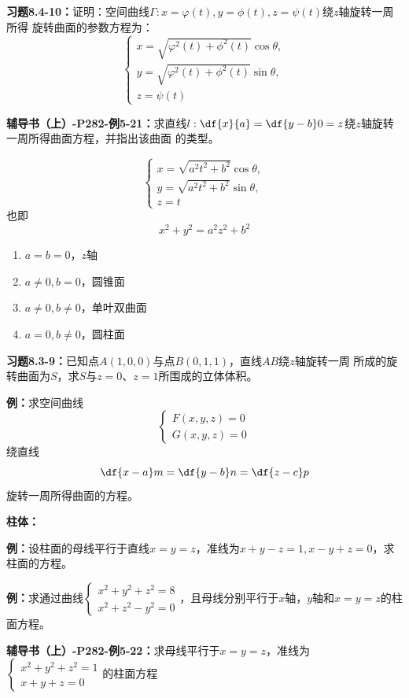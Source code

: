 {\bf 习题8.4-10：}证明：空间曲线$\Gamma:x=\varphi(t),y=\phi(t),z=\psi(t)$绕$z$轴旋转一周所得
旋转曲面的参数方程为：
$$\left\{\begin{array}{l}
	x=\sqrt{\varphi^2(t)+\phi^2(t)}\cos\theta,\\
	y=\sqrt{\varphi^2(t)+\phi^2(t)}\sin\theta,\\
	z=\psi(t)
\end{array}\right.$$

{\bf 辅导书（上）-P282-例5-21：}求直线$l:\df{x}{a}=\df{y-b}0=z$绕$z$轴旋转一周所得曲面方程，并指出该曲面
的类型。

$$\left\{\begin{array}{l}
x=\sqrt{a^2t^2+b^2}\cos\theta,\\ y=\sqrt{a^2t^2+b^2}\sin\theta,\\ z=t
\end{array}\right.$$
也即
$$x^2+y^2=a^2z^2+b^2$$
\begin{enumerate}[(1)]
  \setlength{\itemindent}{1cm}
  \item $a=b=0$，$z$轴
  \item $a\ne0,b=0$，圆锥面
  \item $a\ne0,b\ne0$，单叶双曲面
  \item $a=0,b\ne0$，圆柱面
\end{enumerate}

{\bf 习题8.3-9：}已知点$A(1,0,0)$与点$B(0,1,1)$，直线$AB$绕$z$轴旋转一周
所成的旋转曲面为$S$，求$S$与$z=0$、$z=1$所围成的立体体积。



{\bf 例：}求空间曲线$$\left\{\begin{array}{l}
F(x,y,z)=0\\ G(x,y,z)=0
\end{array}\right.$$绕直线
$$\df{x-a}m=\df{y-b}n=\df{z-c}p$$
旋转一周所得曲面的方程。

{\bf 柱体：}

{\bf 例：}设柱面的母线平行于直线$x=y=z$，准线为$x+y-z=1,x-y+z=0$，求柱面的方程。

{\bf 例：}求通过曲线$\left\{\begin{array}{l}
	x^2+y^2+z^2=8\\
	x^2+z^2-y^2=0
\end{array}\right.$，且母线分别平行于$x$轴，$y$轴和$x=y=z$的柱面方程。

{\bf  辅导书（上）-P282-例5-22：}求母线平行于$x=y=z$，准线为
$\left\{\begin{array}{l}
	x^2+y^2+z^2=1\\ x+y+z=0
\end{array}\right.$的柱面方程

